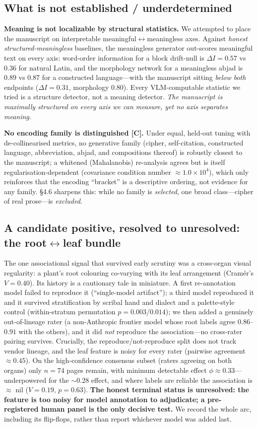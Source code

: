 \documentclass[11pt]{article}
\newcommand{\grade}[1]{{\small\textbf{[#1]}}}
\begin{document}
\subsection{What is not established / underdetermined}
\textbf{Meaning is not localizable by structural statistics.} We attempted to place
the manuscript on interpretable meaningful$\leftrightarrow$meaningless axes. Against
\emph{honest structured-meaningless} baselines, the meaningless generator out-scores
meaningful text on every axis: word-order information for a block drift-null is
$\Delta I = 0.57$ vs $0.36$ for natural Latin, and the morphology network for a
meaningless abjad is $0.89$ vs $0.87$ for a constructed language---with the manuscript
sitting \emph{below both} endpoints ($\Delta I = 0.31$, morphology $0.80$). Every
VLM-computable statistic we tried is a structure detector, not a meaning detector.
\emph{The manuscript is maximally structured on every axis we can measure, yet no axis
separates meaning.}

\textbf{No encoding family is distinguished \grade{C}.} Under equal, held-out tuning
with de-collinearised metrics, no generative family (cipher, self-citation,
constructed language, abbreviation, abjad, and compositions thereof) is robustly
closest to the manuscript; a whitened (Mahalanobis) re-analysis agrees but is itself
regularisation-dependent (covariance condition number $\approx 1.0\times10^{4}$),
which only reinforces that the encoding ``bracket'' is a descriptive ordering, not
evidence for any family. \S4.6 sharpens this: while no family is \emph{selected}, one
broad class---cipher of real prose---is \emph{excluded}.

\subsection{A candidate positive, resolved to unresolved: the root$\leftrightarrow$leaf bundle}
The one associational signal that survived early scrutiny was a cross-organ visual
regularity: a plant's root colouring co-varying with its leaf arrangement (Cram\'er's
$V=0.40$). Its history is a cautionary tale in miniature. A first re-annotation model
failed to reproduce it (``single-model artifact''); a third model reproduced it and it
survived stratification by scribal hand and dialect and a palette-style control
(within-stratum permutation $p=0.003$/$0.014$); we then added a genuinely
out-of-lineage rater (a non-Anthropic frontier model whose root labels agree
$0.86$--$0.91$ with the others), and it did \emph{not} reproduce the association---no
cross-rater pairing survives. Crucially, the reproduce/not-reproduce split does not
track vendor lineage, and the leaf feature is noisy for every rater (pairwise
agreement $\approx 0.45$). On the high-confidence consensus subset (raters agreeing on
both organs) only $n=74$ pages remain, with minimum detectable effect $\phi\approx
0.33$---underpowered for the $\sim 0.28$ effect, and where labels are reliable the
association is $\approx$ nil ($V=0.19$, $p=0.63$). \textbf{The honest terminal status
is unresolved: the feature is too noisy for model annotation to adjudicate; a
pre-registered human panel is the only decisive test.} We record the whole arc,
including its flip-flops, rather than report whichever model was added last.
\end{document}
